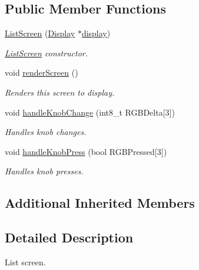 \subsection*{Public Member Functions}
\begin{DoxyCompactItemize}
\item 
\mbox{\hyperlink{classListScreen_a502ff7cf893ae6d10ed7bc1ca7a8ffe8}{List\+Screen}} (\mbox{\hyperlink{classDisplay}{Display}} $\ast$\mbox{\hyperlink{classScreen_aad713267725e8aa8a8def951a07de641}{display}})
\begin{DoxyCompactList}\small\item\em \mbox{\hyperlink{classListScreen}{List\+Screen}} constructor. \end{DoxyCompactList}\item 
\mbox{\label{classListScreen_a364b4ccc88650c13295efae8431b135e}} 
void \mbox{\hyperlink{classListScreen_a364b4ccc88650c13295efae8431b135e}{render\+Screen}} ()
\begin{DoxyCompactList}\small\item\em Renders this screen to display. \end{DoxyCompactList}\item 
\mbox{\label{classListScreen_a4e0f2e67dbfbcf8560209f01d2cab1c6}} 
void \mbox{\hyperlink{classListScreen_a4e0f2e67dbfbcf8560209f01d2cab1c6}{handle\+Knob\+Change}} (int8\+\_\+t R\+G\+B\+Delta\mbox{[}3\mbox{]})
\begin{DoxyCompactList}\small\item\em Handles knob changes. \end{DoxyCompactList}\item 
\mbox{\label{classListScreen_aecf861357be2b6debde43e61c9a7671b}} 
void \mbox{\hyperlink{classListScreen_aecf861357be2b6debde43e61c9a7671b}{handle\+Knob\+Press}} (bool R\+G\+B\+Pressed\mbox{[}3\mbox{]})
\begin{DoxyCompactList}\small\item\em Handles knob presses. \end{DoxyCompactList}\end{DoxyCompactItemize}
\subsection*{Additional Inherited Members}


\subsection{Detailed Description}
List screen. 

